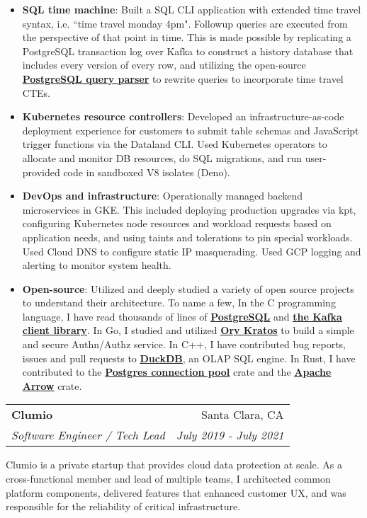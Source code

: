 \documentclass[letterpaper,11pt]{article}
\makeatletter
\newcommand{\resumeItem}[2]{
  \item\small{
    \textbf{#1}{: #2 \vspace{-2pt}}
  }
}
\newcommand{\resumeSubheading}[4]{
  \vspace{-1pt}
    \begin{tabular*}{0.97\textwidth}{l@{\extracolsep{\fill}}r}
      \textbf{#1} & #2 \\
      \textit{\small#3} & \textit{\small #4} \\
    \end{tabular*}\vspace{-5pt}
}
\newcommand{\resumeItemListStart}{\begin{itemize}}
\newcommand{\resumeItemListEnd}{\end{itemize}\vspace{-5pt}}
\makeatother
\begin{document}
      \resumeItemListStart
      \resumeItem{SQL time machine}
          {Built a SQL CLI application with extended time travel syntax, i.e. ``time travel monday 4pm". Followup queries are executed from the perspective of that point in time. This is made possible by replicating a PostgreSQL transaction log over Kafka to construct a history database that includes every version of every row, and utilizing the open-source \href{https://github.com/pganalyze/libpg_query}{\textbf{\underline{PostgreSQL query parser}}} to rewrite queries to incorporate time travel CTEs.}
      \resumeItem{Kubernetes resource controllers}
          {Developed an infrastructure-as-code deployment experience for customers to submit table schemas and JavaScript trigger functions via the Dataland CLI. Used Kubernetes operators to allocate and monitor DB resources, do SQL migrations, and run user-provided code in sandboxed V8 isolates (Deno).}
        \resumeItem{DevOps and infrastructure}
          {Operationally managed backend microservices in GKE. This included deploying production upgrades via kpt, configuring Kubernetes node resources and workload requests based on application needs, and using taints and tolerations to pin special workloads. Used Cloud DNS to configure static IP masquerading. Used GCP logging and alerting to monitor system health.}
      \resumeItem{Open-source}
          {Utilized and deeply studied a variety of open source projects to understand their architecture. To name a few, In the C programming language, I have read thousands of lines of \href{https://github.com/postgres/postgres}{\textbf{\underline{PostgreSQL}}} and \href{https://github.com/confluentinc/librdkafka}{\textbf{\underline{the Kafka client library}}}. In Go, I studied and utilized \href{https://github.com/ory/kratos}{\textbf{\underline{Ory Kratos}}} to build a simple and secure Authn/Authz service. In C++, I have contributed bug reports, issues and pull requests to \href{https://github.com/duckdb/duckdb/issues?q=author\%3Aaarashy}{\underline{\textbf{DuckDB}}}, an OLAP SQL engine. In Rust, I have contributed to the \href{https://github.com/bikeshedder/deadpool}{\textbf{\underline{Postgres connection pool}}} crate and the \href{https://github.com/apache/arrow-rs}{\textbf{\underline{Apache Arrow}}} crate.}
    \resumeItemListEnd
    \vspace{5mm}
    \resumeSubheading
      {Clumio}{Santa Clara, CA}
      {Software Engineer / Tech Lead}{July 2019 - July 2021}
      
      \vspace{4mm}
      Clumio is a private startup that provides cloud data protection at scale. As a cross-functional member and lead of multiple teams, I architected common platform components, delivered features that enhanced customer UX, and was responsible for the reliability of critical infrastructure. 
      
\end{document}
